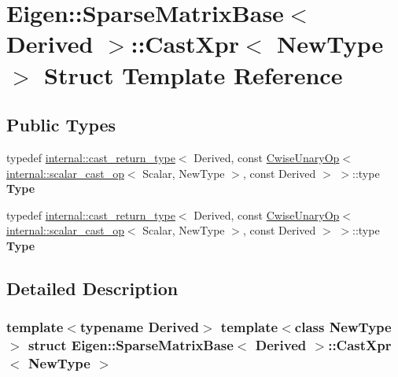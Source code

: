 \hypertarget{struct_eigen_1_1_sparse_matrix_base_1_1_cast_xpr}{}\section{Eigen\+:\+:Sparse\+Matrix\+Base$<$ Derived $>$\+:\+:Cast\+Xpr$<$ New\+Type $>$ Struct Template Reference}
\label{struct_eigen_1_1_sparse_matrix_base_1_1_cast_xpr}
\subsection*{Public Types}
\begin{DoxyCompactItemize}
\item 
\mbox{\label{struct_eigen_1_1_sparse_matrix_base_1_1_cast_xpr_a2d3a3873b679db8c1f25da7a1074e52a}} 
typedef \hyperlink{struct_eigen_1_1internal_1_1cast__return__type}{internal\+::cast\+\_\+return\+\_\+type}$<$ Derived, const \hyperlink{group___core___module_class_eigen_1_1_cwise_unary_op}{Cwise\+Unary\+Op}$<$ \hyperlink{struct_eigen_1_1internal_1_1scalar__cast__op}{internal\+::scalar\+\_\+cast\+\_\+op}$<$ Scalar, New\+Type $>$, const Derived $>$ $>$\+::type {\bfseries Type}
\item 
\mbox{\label{struct_eigen_1_1_sparse_matrix_base_1_1_cast_xpr_a2d3a3873b679db8c1f25da7a1074e52a}} 
typedef \hyperlink{struct_eigen_1_1internal_1_1cast__return__type}{internal\+::cast\+\_\+return\+\_\+type}$<$ Derived, const \hyperlink{group___core___module_class_eigen_1_1_cwise_unary_op}{Cwise\+Unary\+Op}$<$ \hyperlink{struct_eigen_1_1internal_1_1scalar__cast__op}{internal\+::scalar\+\_\+cast\+\_\+op}$<$ Scalar, New\+Type $>$, const Derived $>$ $>$\+::type {\bfseries Type}
\end{DoxyCompactItemize}


\subsection{Detailed Description}
\subsubsection*{template$<$typename Derived$>$\newline
template$<$class New\+Type$>$\newline
struct Eigen\+::\+Sparse\+Matrix\+Base$<$ Derived $>$\+::\+Cast\+Xpr$<$ New\+Type $>$}



